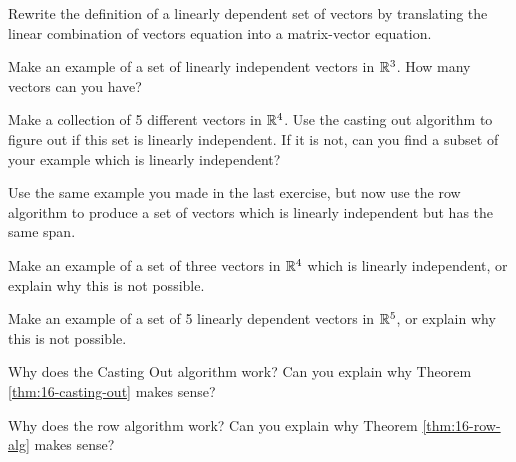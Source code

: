 \documentclass[elementsmain.tex]{subfiles}
\begin{document}
\begin{exercise} Rewrite the definition of a linearly dependent set of vectors by translating the linear combination of vectors equation into a matrix-vector equation.
\end{exercise}

\begin{exercise}
Make an example of a set of linearly independent vectors in $\mathbb{R}^3$. How many vectors can you have?
\end{exercise}

\begin{exercise} Make a collection of 5 different vectors in $\mathbb{R}^4$. Use the casting out algorithm to figure out if this set is linearly independent. If it is not, can you find a subset of your example which is linearly independent?
\end{exercise}

\begin{exercise}
Use the same example you made in the last exercise, but now use the row algorithm to produce a set of vectors which is linearly independent but has the same span. 
\end{exercise}

\begin{exercise} Make an example of a set of three vectors in $\mathbb{R}^4$ which is linearly independent, or explain why this is not possible.
\end{exercise}

\begin{exercise} Make an example of a set of 5 linearly dependent vectors in $\mathbb{R}^5$, or explain why this is not possible.
\end{exercise}

\begin{challenge}
Why does the Casting Out algorithm work? Can you explain why Theorem \ref{thm:16-casting-out} makes sense?
\end{challenge}

\begin{challenge}
Why does the row algorithm work? Can you explain why Theorem \ref{thm:16-row-alg} makes sense?
\end{challenge}



\clearpage
\end{document}

